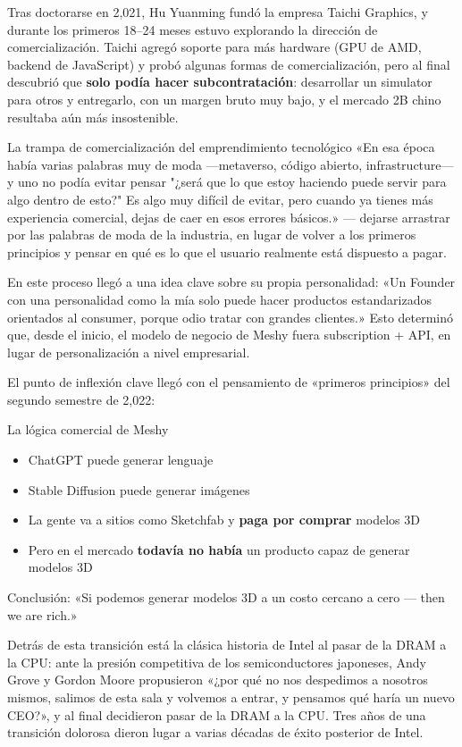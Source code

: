 Tras doctorarse en 2,021, Hu Yuanming fundó la empresa Taichi Graphics, y durante los primeros 18--24 meses estuvo explorando la dirección de comercialización. Taichi agregó soporte para más hardware (GPU de AMD, backend de JavaScript) y probó algunas formas de comercialización, pero al final descubrió que \textbf{solo podía hacer subcontratación}: desarrollar un simulator para otros y entregarlo, con un margen bruto muy bajo, y el mercado 2B chino resultaba aún más insostenible.

\begin{warningbox}{La trampa de comercialización del emprendimiento tecnológico}
«En esa época había varias palabras muy de moda —metaverso, código abierto, infrastructure— y uno no podía evitar pensar "¿será que lo que estoy haciendo puede servir para algo dentro de esto?" Es algo muy difícil de evitar, pero cuando ya tienes más experiencia comercial, dejas de caer en esos errores básicos.» — dejarse arrastrar por las palabras de moda de la industria, en lugar de volver a los primeros principios y pensar en qué es lo que el usuario realmente está dispuesto a pagar.
\end{warningbox}

En este proceso llegó a una idea clave sobre su propia personalidad: «Un Founder con una personalidad como la mía solo puede hacer productos estandarizados orientados al consumer, porque odio tratar con grandes clientes.» Esto determinó que, desde el inicio, el modelo de negocio de Meshy fuera subscription + API, en lugar de personalización a nivel empresarial.

El punto de inflexión clave llegó con el pensamiento de «primeros principios» del segundo semestre de 2,022:

\begin{importantbox}{La lógica comercial de Meshy}
\begin{itemize}
\item ChatGPT puede generar lenguaje
\item Stable Diffusion puede generar imágenes
\item La gente va a sitios como Sketchfab y \textbf{paga por comprar} modelos 3D
\item Pero en el mercado \textbf{todavía no había} un producto capaz de generar modelos 3D
\end{itemize}
Conclusión: «Si podemos generar modelos 3D a un costo cercano a cero — then we are rich.»
\end{importantbox}

Detrás de esta transición está la clásica historia de Intel al pasar de la DRAM a la CPU: ante la presión competitiva de los semiconductores japoneses, Andy Grove y Gordon Moore propusieron «¿por qué no nos despedimos a nosotros mismos, salimos de esta sala y volvemos a entrar, y pensamos qué haría un nuevo CEO?», y al final decidieron pasar de la DRAM a la CPU. Tres años de una transición dolorosa dieron lugar a varias décadas de éxito posterior de Intel.

